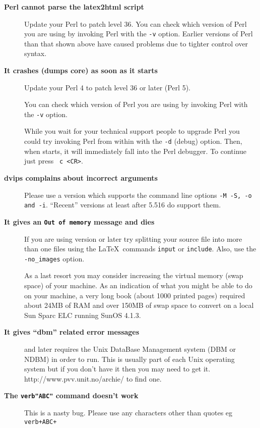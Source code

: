 \begin{description}
\item [{\bf Perl cannot parse the {\fn latex2html} script}]
Update your Perl to patch level 36. You can check which version of
Perl you are using by invoking Perl with the {\tt -v} option.
Earlier versions of Perl than that shown above
have caused problems due
to tighter control over syntax.
\item [{\bf It crashes (dumps core) as soon as it starts \label{perl}}]
Update your Perl 4 to patch level 36 or later (Perl 5).

You can check which version of
Perl you are using by invoking Perl with the {\tt -v} option.


While you wait for your technical support people to upgrade Perl
you could try invoking Perl from within \latextohtml with 
the {\tt -d} (debug) option. Then, when \latextohtml starts, it will
immediately fall into the Perl debugger. To continue just press {\tt
c <CR>}.

\item [{\bf {\fn dvips} complains about incorrect arguments \label{dvips}}]
Please use a version which supports the command line options {\tt -M -S,
-o and -i}. ``Recent'' versions at least after 5.516 do
support them.

\item [{\bf It gives an {\tt Out of memory} message and dies}] 
If you are using version  or later try splitting your 
source file into more than one files using the \LaTeX\ 
commands {\tt input} or {\tt include}. 
Also, use the {\tt -no\_images} option.

As a last resort you may consider increasing the virtual memory
(swap space) of your machine. As an indication 
of what you might be able to do on your machine,
a very long book (about 1000 printed pages) required about 
24MB of RAM and over 150MB of swap space to convert on a local Sun Sparc ELC
running SunOS 4.1.3.

\item [{\bf It gives ``dbm'' related error messages}]
 and later requires the
Unix DataBase Management system (DBM or NDBM) in order to run.
This is usually part of each Unix operating system but if you 
don't have it then you may need to get it. 
{http://www.pvv.unit.no/archie/} to find one.

\item [{\bf The {\tt verb"ABC"} command doesn't work}]
This is a nasty bug. Please use any characters other than quotes eg
{\tt verb+ABC+}


\end{description}
